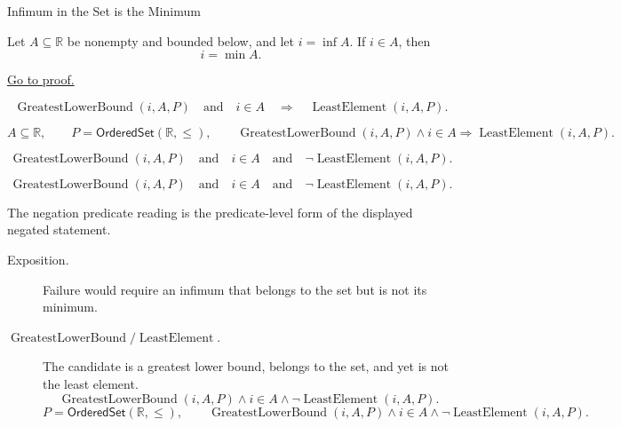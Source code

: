 \begin{propositionbox}{Infimum in the Set is the Minimum}
\begin{proposition}
\label{prop:infimum-in-the-set-is-the-minimum}
Let $A\subseteq\mathbb{R}$ be nonempty and bounded below, and let
$i=\inf A$. If $i\in A$, then
\[
  i=\min A.
\]

\hyperref[prf:infimum-in-the-set-is-the-minimum]{Go to proof.}
\end{proposition}
\end{propositionbox}

\begin{remark*}
\[
  \operatorname{GreatestLowerBound}(i,A,P)
  \quad\text{and}\quad
  i\in A
  \quad\Longrightarrow\quad
  \operatorname{LeastElement}(i,A,P).
\]
\end{remark*}

\begin{remark*}
\[
  A\subseteq\mathbb{R},\qquad P=\mathsf{OrderedSet}(\mathbb{R},\leq),\qquad
  \operatorname{GreatestLowerBound}(i,A,P)\land i\in A
  \Longrightarrow \operatorname{LeastElement}(i,A,P).
\]
\end{remark*}

\begin{remark*}
\[
  \operatorname{GreatestLowerBound}(i,A,P)
  \quad\text{and}\quad
  i\in A
  \quad\text{and}\quad
  \neg\operatorname{LeastElement}(i,A,P).
\]
\end{remark*}

\begin{remark*}
\[
  \operatorname{GreatestLowerBound}(i,A,P)
  \quad\text{and}\quad
  i\in A
  \quad\text{and}\quad
  \neg\operatorname{LeastElement}(i,A,P).
\]

The negation predicate reading is the predicate-level form of the displayed negated statement.
\end{remark*}

\begin{remark*}
\begin{description}
  \item[Exposition.]
  Failure would require an infimum that belongs to the set but is not its
  minimum.

  \item[\(\operatorname{GreatestLowerBound} / \operatorname{LeastElement}.\)]
  The candidate is a greatest lower bound, belongs to the set, and yet is not
  the least element.
  \[
    \operatorname{GreatestLowerBound}(i,A,P)\land i\in A\land
    \neg\operatorname{LeastElement}(i,A,P).
  \]
  \[
    P=\mathsf{OrderedSet}(\mathbb{R},\leq),\qquad
    \operatorname{GreatestLowerBound}(i,A,P)\land i\in A\land
    \neg\operatorname{LeastElement}(i,A,P).
  \]
\end{description}
\end{remark*}

